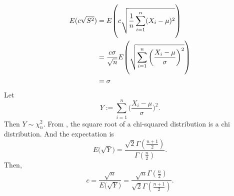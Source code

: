 \begin{align}
    E(c\sqrt{S^2})
        &= E\vast(c\sqrt{\frac{1}{n}\sum_{i=1}^n(X_i-\mu)^2}\vast) \\
        &= \frac{c\sigma}{\sqrt{n}}E\vast(\sqrt{\sum_{i=1}^n\bigg(\frac{X_i-\mu}{\sigma}\bigg)^2}\vast) \\
        &= \sigma
\end{align}
Let
\begin{equation}
    Y:=\sum_{i=1}^n\bigg(\frac{X_i-\mu}{\sigma}\bigg)^2.
\end{equation}
Then $Y\sim\chi^2_n$.
From \cite{chi}, the square root of a chi-squared distribution is a chi distribution.
And the expectation is
\begin{equation}
    E\big(\sqrt{Y}\big) = \frac{\sqrt{2}\Gamma(\frac{n+1}{2})}{\Gamma(\frac{n}{2})}.
\end{equation}
Then,
\begin{equation}
    c = \frac{\sqrt{n}}{E\big(\sqrt{Y}\big)}
      = \frac{\sqrt{n}\Gamma(\frac{n}{2})}{\sqrt{2}\Gamma(\frac{n+1}{2})}.
\end{equation}


\subsection{} %
